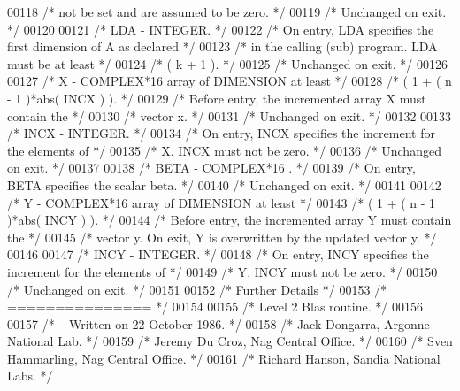 \begin{DoxyCode}
00118 \textcolor{comment}{/*           not be set and are assumed to be zero. */}
00119 \textcolor{comment}{/*           Unchanged on exit. */}
00120 
00121 \textcolor{comment}{/*  LDA    - INTEGER. */}
00122 \textcolor{comment}{/*           On entry, LDA specifies the first dimension of A as declared */}
00123 \textcolor{comment}{/*           in the calling (sub) program. LDA must be at least */}
00124 \textcolor{comment}{/*           ( k + 1 ). */}
00125 \textcolor{comment}{/*           Unchanged on exit. */}
00126 
00127 \textcolor{comment}{/*  X      - COMPLEX*16       array of DIMENSION at least */}
00128 \textcolor{comment}{/*           ( 1 + ( n - 1 )*abs( INCX ) ). */}
00129 \textcolor{comment}{/*           Before entry, the incremented array X must contain the */}
00130 \textcolor{comment}{/*           vector x. */}
00131 \textcolor{comment}{/*           Unchanged on exit. */}
00132 
00133 \textcolor{comment}{/*  INCX   - INTEGER. */}
00134 \textcolor{comment}{/*           On entry, INCX specifies the increment for the elements of */}
00135 \textcolor{comment}{/*           X. INCX must not be zero. */}
00136 \textcolor{comment}{/*           Unchanged on exit. */}
00137 
00138 \textcolor{comment}{/*  BETA   - COMPLEX*16      . */}
00139 \textcolor{comment}{/*           On entry, BETA specifies the scalar beta. */}
00140 \textcolor{comment}{/*           Unchanged on exit. */}
00141 
00142 \textcolor{comment}{/*  Y      - COMPLEX*16       array of DIMENSION at least */}
00143 \textcolor{comment}{/*           ( 1 + ( n - 1 )*abs( INCY ) ). */}
00144 \textcolor{comment}{/*           Before entry, the incremented array Y must contain the */}
00145 \textcolor{comment}{/*           vector y. On exit, Y is overwritten by the updated vector y. */}
00146 
00147 \textcolor{comment}{/*  INCY   - INTEGER. */}
00148 \textcolor{comment}{/*           On entry, INCY specifies the increment for the elements of */}
00149 \textcolor{comment}{/*           Y. INCY must not be zero. */}
00150 \textcolor{comment}{/*           Unchanged on exit. */}
00151 
00152 \textcolor{comment}{/*  Further Details */}
00153 \textcolor{comment}{/*  =============== */}
00154 
00155 \textcolor{comment}{/*  Level 2 Blas routine. */}
00156 
00157 \textcolor{comment}{/*  -- Written on 22-October-1986. */}
00158 \textcolor{comment}{/*     Jack Dongarra, Argonne National Lab. */}
00159 \textcolor{comment}{/*     Jeremy Du Croz, Nag Central Office. */}
00160 \textcolor{comment}{/*     Sven Hammarling, Nag Central Office. */}
00161 \textcolor{comment}{/*     Richard Hanson, Sandia National Labs. */}

\end{DoxyCode}
